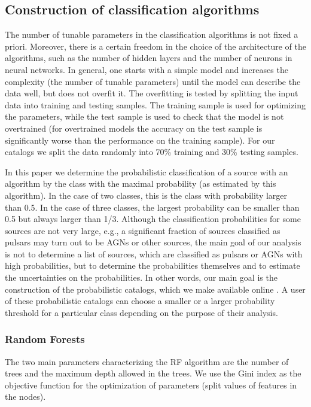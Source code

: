 \subsection{Construction of classification algorithms}

The number of tunable parameters in the classification algorithms is not fixed a priori. 
Moreover, there is a certain freedom in the choice of the architecture of the algorithms, such as
the number of hidden layers and the number of neurons in neural networks.
In general, one starts with a simple model and increases the complexity (the number of tunable parameters)
until the model can describe the data well, but does not overfit it.
The overfitting is tested by splitting the input data into training and testing samples.
The training sample is used for optimizing the parameters,
while the test sample is used to check that the model is not overtrained (for overtrained models the accuracy on the test
sample is significantly worse than the performance on the training sample).
For our catalogs we split the data randomly into 70\% training and 30\% testing samples.

In this paper we determine the probabilistic classification of a source with an algorithm by the class with the maximal probability (as estimated by this algorithm). In the case of two classes, this is the class with probability larger than 0.5. In the case of three classes, the largest probability can be smaller than 0.5 but always larger than 1/3. Although the classification probabilities for some sources are not very large, e.g., a significant fraction of sources classified as pulsars may turn out to be AGNs or other sources, the main goal of our analysis is not to determine a list of sources, which are classified as pulsars or AGNs with high probabilities, but to determine the probabilities themselves and to estimate the uncertainties on the probabilities. In other words, our main goal is the construction of the probabilistic catalogs, which we make available online \citep{SOM_material}. A user of these probabilistic catalogs can choose a smaller or a larger probability threshold for a particular class depending on the purpose of their analysis.


\subsubsection{Random Forests}

The two main parameters characterizing the RF algorithm are the number of trees and the maximum depth allowed in the trees. 
We use the Gini index as the objective function for the optimization of parameters (split values of features in the nodes).

